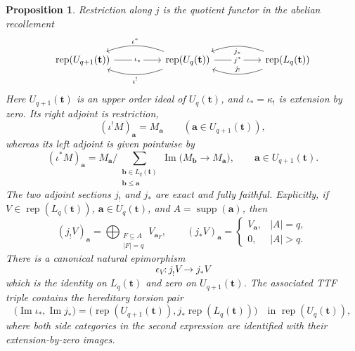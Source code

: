 \documentclass[12pt,reqno]{amsart}
\newtheorem{proposition}[theorem]{Proposition}
\theoremstyle{definition}
\theoremstyle{remark}
\newcommand{\Rep}{\operatorname{rep}}
\begin{document}
\begin{proposition}\label{prop:horizontal-embeddings}
Restriction along $j$ is the quotient functor in the abelian recollement
\[
\begin{tikzcd}[column sep=4.8em]
\Rep(U_{q+1}(\mathbf t))
  \arrow[r, "\iota_*" description]
& \Rep(U_q(\mathbf t))
  \arrow[l, bend right=20, "\iota^*"']
  \arrow[l, bend left=20, "\iota^!"]
  \arrow[r, "j^*" description]
& \Rep(L_q(\mathbf t))
  \arrow[l, bend left=20, "j_!"']
  \arrow[l, bend right=20, "j_*"]
\end{tikzcd}
\]
Here $U_{q+1}(\mathbf t)$ is an upper order ideal of $U_q(\mathbf t)$, and
$\iota_*=\kappa_!$ is extension by zero.  Its right adjoint is restriction,
\[
(\iota^!M)_{\mathbf a}=M_{\mathbf a}
\qquad(\mathbf a\in U_{q+1}(\mathbf t)),
\]
whereas its left adjoint is given pointwise by
\[
(\iota^*M)_{\mathbf a}
=
M_{\mathbf a}\Big/
\sum_{\substack{\mathbf b\in L_q(\mathbf t)\\\mathbf b\le\mathbf a}}
\operatorname{Im}\bigl(M_{\mathbf b}\longrightarrow M_{\mathbf a}\bigr),
\qquad \mathbf a\in U_{q+1}(\mathbf t).
\]
The two adjoint sections $j_!$ and $j_*$ are exact and fully faithful.  Explicitly, if $V\in\Rep(L_q(\mathbf t))$, $\mathbf a\in U_q(\mathbf t)$, and $A=\operatorname{supp}(\mathbf a)$, then
\[
(j_!V)_{\mathbf a}
=
\bigoplus_{\substack{F\subseteq A\\|F|=q}}V_{\mathbf a_F},
\qquad
(j_*V)_{\mathbf a}
=
\begin{cases}
V_{\mathbf a},&|A|=q,\\
0,&|A|>q.
\end{cases}
\]
There is a canonical natural epimorphism
\[
\epsilon_V:j_!V\longrightarrow j_*V
\]
which is the identity on $L_q(\mathbf t)$ and zero on $U_{q+1}(\mathbf t)$.
The associated TTF triple contains the hereditary torsion pair
\[
\bigl(\operatorname{Im}\iota_*,\operatorname{Im}j_*\bigr)
=
\bigl(\Rep(U_{q+1}(\mathbf t)),j_*\Rep(L_q(\mathbf t))\bigr)
\quad\text{in }\Rep(U_q(\mathbf t)),
\]
where both side categories in the second expression are identified with their
extension-by-zero images.
\end{proposition}
\end{document}
